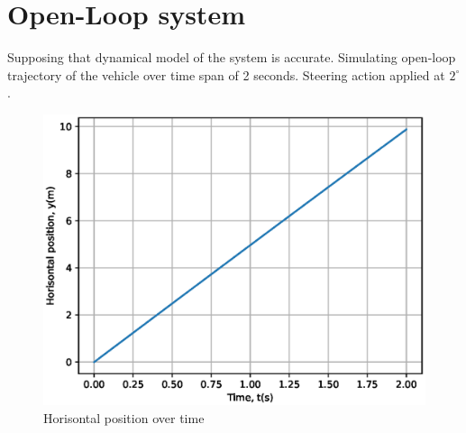 \section{Open-Loop system}%
\label{openloop}

Supposing that dynamical model of the system is accurate. Simulating open-loop trajectory of the vehicle over time span of 2 seconds. Steering action applied at $2^{\circ}$.

\begin{figure}[H]
	\centering
	\captionsetup{justification=centering}
	\includegraphics[width=0.8\linewidth]{imgs/t1_x_t.eps}
	\caption{Horisontal position over time}%
	\label{fig:1}
\end{figure}

